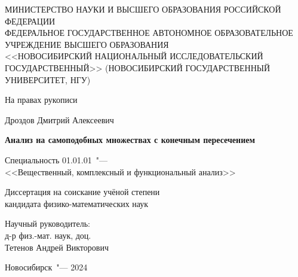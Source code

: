 \thispagestyle{empty}
\begin{center}
МИНИСТЕРСТВО НАУКИ И ВЫСШЕГО ОБРАЗОВАНИЯ РОССИЙСКОЙ ФЕДЕРАЦИИ\\
ФЕДЕРАЛЬНОЕ ГОСУДАРСТВЕННОЕ АВТОНОМНОЕ ОБРАЗОВАТЕЛЬНОЕ УЧРЕЖДЕНИЕ ВЫСШЕГО ОБРАЗОВАНИЯ\\
<<НОВОСИБИРСКИЙ НАЦИОНАЛЬНЫЙ ИССЛЕДОВАТЕЛЬСКИЙ ГОСУДАРСТВЕННЫЙ>> (НОВОСИБИРСКИЙ ГОСУДАРСТВЕННЫЙ УНИВЕРСИТЕТ, НГУ)
\end{center}

\vspace{0pt plus4fill}
\begin{flushright}
На правах рукописи
\end{flushright}


\vspace{0pt plus6fill}
\begin{center}
{\large Дроздов Дмитрий Алексеевич}
\end{center}

\vspace{0pt plus1fill}
\begin{center}
\textbf {\large %
Анализ на самоподобных множествах с конечным пересечением}

\vspace{0pt plus2fill} 
{%
Специальность 01.01.01\ "---\\
<<Вещественный, комплексный и функциональный анализ>>}

\vspace{0pt plus2fill}
Диссертация на соискание учёной степени\\
кандидата физико-математических наук
\end{center}

\vspace{0pt plus4fill}
\begin{flushright}
Научный руководитель:\\
д-р физ.-мат. наук, доц.\\
Тетенов Андрей Викторович
\end{flushright}

\vspace{0pt plus4fill}
{\centering Новосибирск\ "--- 2024\par}